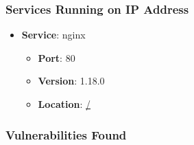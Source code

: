 \documentclass{article}
\begin{document}
\subsubsection*{Services Running on IP Address}

\begin{itemize}
    
        \item \textbf{Service}: nginx
        \begin{itemize}
            \item \textbf{Port}: 80
            \item \textbf{Version}:  1.18.0 
            \item \textbf{Location}: \href{ / }{ / }
        \end{itemize}
    
\end{itemize}


\subsubsection*{Vulnerabilities Found}
\end{document}
